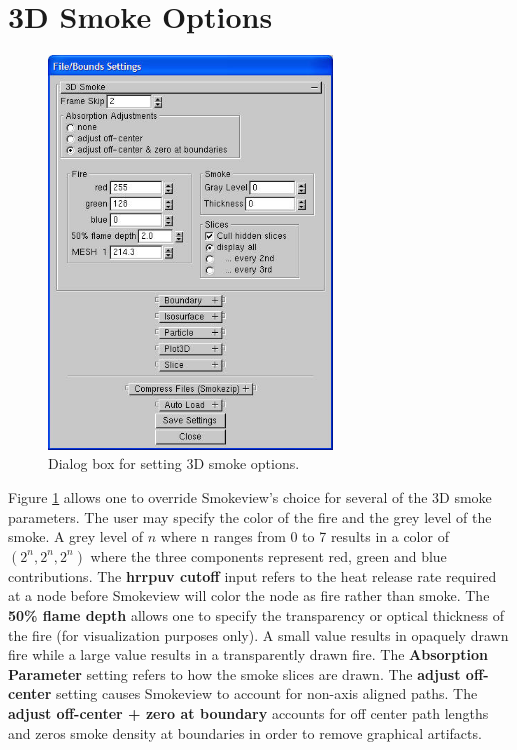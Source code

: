\documentclass[11pt,twoside]{book}
\newcommand{\figoptions}{hbp}
\begin{document}
\section{3D Smoke Options}
\begin{figure}[\figoptions]
\centerline{\includegraphics[width=2.9722in]{figures/fig3DSmoke} }
\caption[Dialog Box for setting 3D smoke options] {Dialog box for
setting 3D smoke options.   } \label{fig3DSmoke}
\end{figure}
Figure \ref{fig3DSmoke} allows one to override Smokeview's choice
for several of the 3D smoke parameters.  The user may specify the
color of the fire and the grey level of the smoke.  A grey level
of $n$ where n ranges from 0 to 7 results in a color of
$(2^n,2^n,2^n)$ where the three components represent red, green
and blue contributions.  The {\bf hrrpuv cutoff} input refers to
the heat release rate required at a node before Smokeview will
color the node as fire rather than smoke.  The {\bf 50\% flame
depth} allows one to specify the transparency or optical thickness
of the fire (for visualization purposes only). A small value
results in opaquely drawn fire while a large value results in a
transparently drawn fire. The {\bf Absorption Parameter} setting
refers to how the smoke slices are drawn.  The {\bf adjust
off-center} setting causes Smokeview to account for non-axis
aligned paths. The {\bf adjust off-center + zero at boundary}
accounts for off center path lengths and zeros smoke density at
boundaries in order to remove graphical artifacts.
\end{document}

